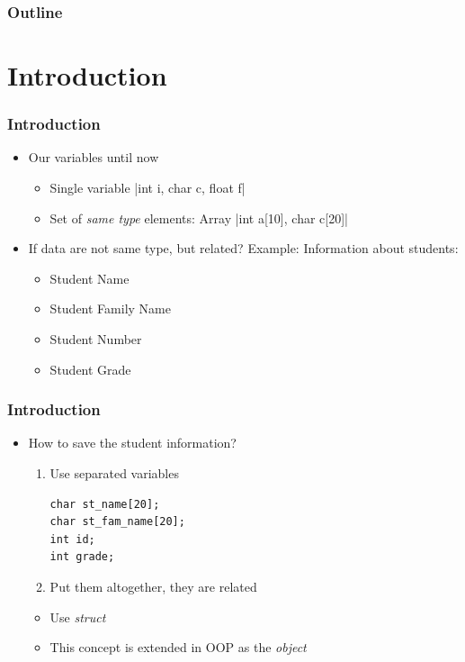 \documentclass{../c-lecture}
\subtitle{Structures}
\begin{document}
\begin{frame}
  \titlepage{}
\end{frame}
\begin{frame}
  \frametitle{Outline}
  \tableofcontents{}
\end{frame}

\section{Introduction}

\begin{frame}
  \frametitle{Introduction}
  \begin{itemize}
    \item Our variables until now
    \begin{itemize}
      \item Single variable
      |int i, char c, float f|
      \item Set of \textit{\color{YellowOrange} same type} elements: Array
      |int a[10], char c[20]|
    \end{itemize}
  \end{itemize}
\end{frame}

\begin{frame}
  \begin{itemize}
    \item
      If data are not same type, but related? Example: Information about
      students:
    \begin{itemize}
      \item Student Name
      \item Student Family Name
      \item Student Number
      \item Student Grade
    \end{itemize}
  \end{itemize}
\end{frame}

\begin{frame}[fragile]
  \frametitle{Introduction}
  \begin{itemize}
    \item How to save the student information?
    \begin{enumerate}
      \item Use separated variables
      \begin{verbatim}
char st_name[20];
char st_fam_name[20];
int id;
int grade;
      \end{verbatim}
      \item Put them altogether, they are related
    \end{enumerate}
    \begin{itemize}
      \item Use \textit{\color{Cyan} struct}
      \item
        This concept is extended in OOP as the
        \textit{\color{YellowOrange} object}
    \end{itemize}
  \end{itemize}
\end{frame}
\end{document}
